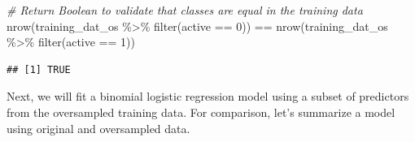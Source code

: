 \documentclass[
]{book}
\newenvironment{Shaded}{\begin{snugshade}}{\end{snugshade}}
\newcommand{\CommentTok}[1]{\textcolor[rgb]{0.56,0.35,0.01}{\textit{#1}}}
\newcommand{\DecValTok}[1]{\textcolor[rgb]{0.00,0.00,0.81}{#1}}
\newcommand{\FunctionTok}[1]{\textcolor[rgb]{0.00,0.00,0.00}{#1}}
\newcommand{\NormalTok}[1]{#1}
\newcommand{\SpecialCharTok}[1]{\textcolor[rgb]{0.00,0.00,0.00}{#1}}
\begin{document}
\begin{Shaded}
\begin{Highlighting}[]
\CommentTok{\# Return Boolean to validate that classes are equal in the training data}
\FunctionTok{nrow}\NormalTok{(training\_dat\_os }\SpecialCharTok{\%\textgreater{}\%} \FunctionTok{filter}\NormalTok{(active }\SpecialCharTok{==} \DecValTok{0}\NormalTok{)) }\SpecialCharTok{==} \FunctionTok{nrow}\NormalTok{(training\_dat\_os }\SpecialCharTok{\%\textgreater{}\%} \FunctionTok{filter}\NormalTok{(active }\SpecialCharTok{==} \DecValTok{1}\NormalTok{))}
\end{Highlighting}
\end{Shaded}

\begin{verbatim}
## [1] TRUE
\end{verbatim}

Next, we will fit a binomial logistic regression model using a subset of predictors from the oversampled training data. For comparison, let's summarize a model using original and oversampled data.

\providecommand{\docline}[3]{\noalign{\global\setlength{\arrayrulewidth}{#1}}\arrayrulecolor[HTML]{#2}\cline{#3}}

\setlength{\tabcolsep}{2pt}

\renewcommand*{\arraystretch}{1.5}
\end{document}
